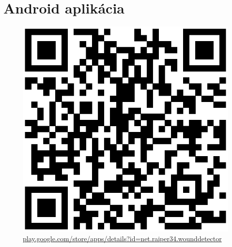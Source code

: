 \chapter{Android aplikácia}
\label{pr:qr}
\begin{figure}[h]
      \centering
      \includegraphics[scale=0.6]{fig/qr-play-google-com.eps}
      \caption{\href{https://play.google.com/store/apps/details?id=net.raiper34.wounddetector}{play.google.com/store/apps/details?id=net.raiper34.wounddetector}}
      \label{fig:qr}
\end{figure}
